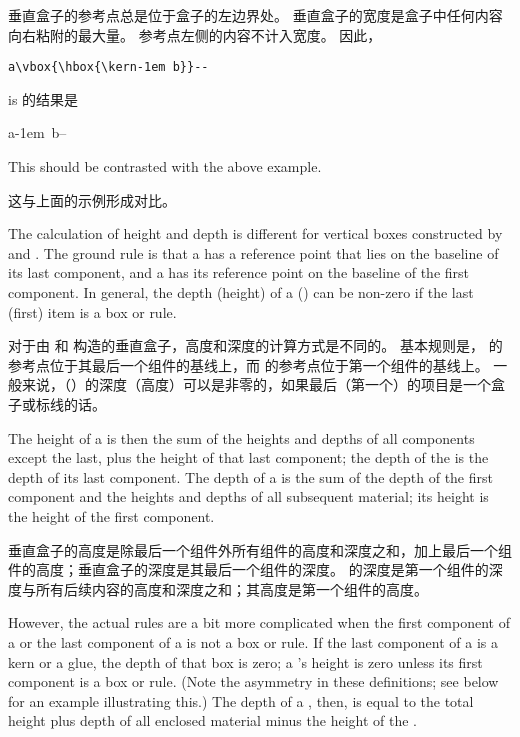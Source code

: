 \documentclass[twoside,letterpaper]{rapport3}
\begin{document}
垂直盒子的参考点总是位于盒子的左边界处。
垂直盒子的宽度是盒子中任何内容向右粘附的最大量。
参考点左侧的内容不计入宽度。
因此，
\begin{disp}\verb>a\vbox{\hbox{\kern-1em b}}-->\end{disp}
is 的结果是
\begin{disp}\leavevmode\hphantom{b}a\vbox{\hbox{\kern-1em b}}--\end{disp}
This should be contrasted with the above example.

这与上面的示例形成对比。


The calculation of height and depth is different
for vertical boxes constructed by  and .
The ground rule is that
\awp
a  has a reference point that lies on
the baseline of its last component,
and a  has its reference point on the baseline of the
first component.
In general, the depth (height) of a  ()
\alt
can be non-zero if the last (first) item is a box or rule.

对于由  和  构造的垂直盒子，高度和深度的计算方式是不同的。
基本规则是， 的参考点位于其最后一个组件的基线上，而  的参考点位于第一个组件的基线上。
一般来说，（）的深度（高度）可以是非零的，如果最后（第一个）的项目是一个盒子或标线的话。



The height of a  is then the sum of the heights and
depths of all components except the last, plus the height
of that last component; the depth of the  is the
depth of its last component.
The depth of a 
is the sum of the depth of the first component and the heights
and depths of all subsequent material; its height is the
height of the first component.

垂直盒子的高度是除最后一个组件外所有组件的高度和深度之和，加上最后一个组件的高度；垂直盒子的深度是其最后一个组件的深度。
 的深度是第一个组件的深度与所有后续内容的高度和深度之和；其高度是第一个组件的高度。

However, the actual rules are a bit
more complicated when the first component of a 
or the last component of a  is not a box or rule.
If the last component of a  is a kern or a glue,
the depth of that box is zero; a 's 
height is zero
unless its first component is a box or rule.
\altt
(Note the asymmetry in these definitions; see below for
an example illustrating this.)
The depth of a , then, is equal to the total
height plus depth of all enclosed material minus
the height of the .
\end{document}

